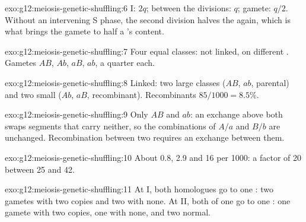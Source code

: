 \begin{solution}{exo:g12:meiosis-genetic-shuffling:6}
 I: $2q$; between the divisions: $q$; gamete: $q/2$. Without an
intervening S phase, the second division halves the  again, which
is what brings the gamete to half a  's content.
\end{solution}

\begin{solution}{exo:g12:meiosis-genetic-shuffling:7}
Four equal classes: not linked, on different . Gametes
$AB$, $Ab$, $aB$, $ab$, a quarter each.
\end{solution}

\begin{solution}{exo:g12:meiosis-genetic-shuffling:8}
Linked: two large classes ($AB$, $ab$, parental) and two small ($Ab$,
$aB$, recombinant). Recombinants $85/1000 = 8.5\%$.
\end{solution}

\begin{solution}{exo:g12:meiosis-genetic-shuffling:9}
Only $AB$ and $ab$: an exchange above both  swaps segments that
carry neither, so the combinations of $A/a$ and $B/b$ are unchanged.
Recombination between two  requires an exchange between them.
\end{solution}

\begin{solution}{exo:g12:meiosis-genetic-shuffling:10}
About 0.8, 2.9 and 16 per 1000: a factor of 20 between 25 and 42.
\end{solution}

\begin{solution}{exo:g12:meiosis-genetic-shuffling:11}
At  I, both homologues go to one : two gametes with two
copies and two with none. At  II, both  of one
 go to one : one gamete with two copies, one with none,
and two normal.
\end{solution}

